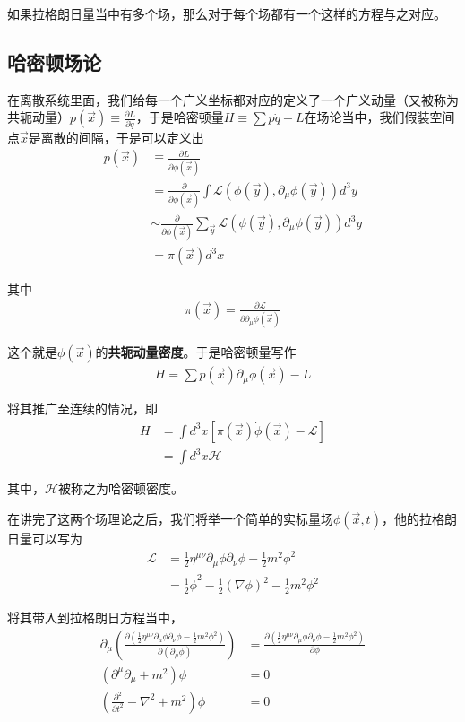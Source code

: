 \documentclass{article}
\begin{document}
如果拉格朗日量当中有多个场，那么对于每个场都有一个这样的方程与之对应。





\subsection{哈密顿场论}
在离散系统里面，我们给每一个广义坐标都对应的定义了一个广义动量（又被称为共轭动量）$p(\vec{x})\equiv\frac{\partial L}{\partial \dot{q}}$，于是哈密顿量$H\equiv\sum p\dot{q}-L$在场论当中，我们假装空间点$\vec{x}$是离散的间隔，于是可以定义出
\begin{align*}
    p(\vec{x})&\equiv\frac{\partial L}{\partial \phi(\vec{x})}\\
    &=\frac{\partial}{\partial \phi(\vec{x})}\int\mathcal{L}(\phi(\vec{y}),\partial_\mu\phi(\vec{y}))d^3y\\
    &\sim \frac{\partial}{\partial \phi(\vec{x})}\sum_{\vec{y}}\mathcal{L}(\phi(\vec{y}),\partial_\mu\phi(\vec{y}))d^3y\\
    &=\pi(\vec{x})d^3x
\end{align*}

其中
\begin{align*}
    \pi(\vec{x})=\frac{\partial \mathcal{L}}{\partial \partial_\mu\phi(\vec{x})}
\end{align*}

这个就是$\phi(\vec{x})$的\textbf{共轭动量密度}。于是哈密顿量写作
\begin{align*}
    H=\sum p(\vec{x})\partial_\mu\phi(\vec{x})-L
\end{align*}

将其推广至连续的情况，即
\begin{align*}
    H&=\int d^3x \left[\pi(\vec{x})\dot{\phi}(\vec{x})-\mathcal{L}\right]\\
    &=\int d^3x \mathcal{H}
\end{align*}

其中，$\mathcal{H}$被称之为哈密顿密度。


在讲完了这两个场理论之后，我们将举一个简单的实标量场$\phi(\vec{x},t)$，他的拉格朗日量可以写为
\begin{align*}
    \mathcal{L}&=\frac{1}{2}\eta^{\mu\nu}\partial_\mu\phi\partial_\nu\phi-\frac{1}{2}m^2\phi^2\\
    &=\frac{1}{2}\dot{\phi}^2-\frac{1}{2}(\nabla \phi)^2-\frac{1}{2}m^2\phi^2
\end{align*}

将其带入到拉格朗日方程当中，
\begin{align*}
    \partial_\mu\left(\frac{\partial(\frac{1}{2}\eta^{\mu\nu}\partial_\mu\phi\partial_\nu\phi-\frac{1}{2}m^2\phi^2)}{\partial(\partial_\mu\phi)}\right)&=\frac{\partial(\frac{1}{2}\eta^{\mu\nu}\partial_\mu\phi\partial_\nu\phi-\frac{1}{2}m^2\phi^2)}{\partial \phi}\\
    \left(\partial^\mu\partial_\mu+m^2\right)\phi&=0\\
    \left(\frac{\partial^2}{\partial t^2}-\nabla^2+m^2\right)\phi&=0
\end{align*}
\end{document}
